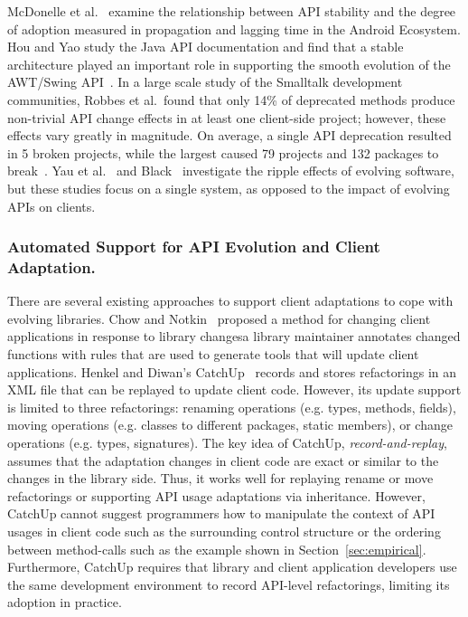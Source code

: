 \documentclass[runningheads,a4paper]{llncs}
\begin{document}
McDonelle et al.~\cite{McDonnell2013:api} examine the relationship between API stability and the degree of adoption measured in propagation and lagging time in the Android Ecosystem.  Hou and Yao study the Java API documentation and find that a stable architecture played an important role in supporting the smooth evolution of the AWT/Swing API~\cite{Hou2011:api}.  
In a large scale study of the Smalltalk development communities, Robbes et al.~found that only 14\% of deprecated methods produce non-trivial API change effects in at least one client-side project; however, these effects vary greatly in magnitude. On average, a single API deprecation resulted in 5 broken projects, while the largest caused 79 projects and 132 packages to break~\cite{robbes2012}.
Yau et al.~\cite{Yau1978} and Black~\cite{Black2001} investigate the ripple effects of evolving software, but these studies focus on a single system, as opposed to the impact of evolving APIs on clients.


\subsubsection{Automated Support for API Evolution and Client Adaptation.} 
There are several existing approaches to support client adaptations to cope with evolving libraries.  Chow and Notkin~\cite{Chow1996} proposed a method for changing client applications in response to library changes\textemdash a library maintainer annotates changed functions with rules that are used to generate tools that will update client applications. Henkel and Diwan's CatchUp~\cite{Henkel2005} records and stores refactorings in an XML file that can be replayed to update client code. However, its update support is limited to three refactorings: renaming operations (e.g.  types, methods, fields), moving operations (e.g. classes to different packages, static members), or change operations (e.g. types, signatures). The key idea of CatchUp, {\em record-and-replay}, assumes that the adaptation changes in client code are exact or similar to the changes in the library side. Thus, it works well for replaying rename or move refactorings or supporting API usage adaptations via inheritance. However, CatchUp cannot suggest programmers how to manipulate the context of API usages in client code such as the surrounding control structure or the ordering between method-calls such as the example shown in Section~\ref{sec:empirical}. Furthermore, CatchUp requires that library and client application developers use the same development environment to record API-level refactorings, limiting its adoption in practice.
\end{document}
